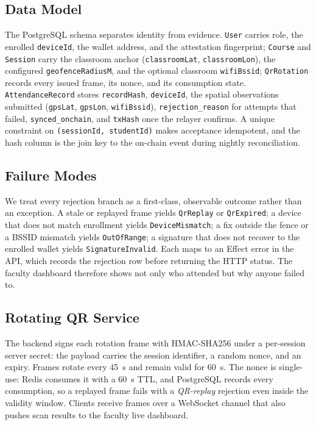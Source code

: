 \documentclass[conference]{IEEEtran}
\begin{document}
\subsection{Data Model}
The PostgreSQL schema separates identity from evidence. \texttt{User} carries
role, the enrolled \texttt{deviceId}, the wallet address, and the attestation
fingerprint; \texttt{Course} and \texttt{Session} carry the classroom anchor
(\texttt{classroomLat}, \texttt{classroomLon}), the configured
\texttt{geofenceRadiusM}, and the optional classroom
\texttt{wifiBssid}; \texttt{QrRotation} records every issued frame, its nonce,
and its consumption state. \texttt{AttendanceRecord} stores
\texttt{recordHash}, \texttt{deviceId}, the spatial observations submitted
(\texttt{gpsLat}, \texttt{gpsLon}, \texttt{wifiBssid}), \texttt{rejection\_reason}
for attempts that failed, \texttt{synced\_onchain}, and \texttt{txHash} once
the relayer confirms. A unique constraint on \texttt{(sessionId, studentId)}
makes acceptance idempotent, and the hash column is the join key to the
on-chain event during nightly reconciliation.

\subsection{Failure Modes}
We treat every rejection branch as a first-class, observable outcome rather
than an exception. A stale or replayed frame yields \texttt{QrReplay} or
\texttt{QrExpired}; a device that does not match enrollment yields
\texttt{DeviceMismatch}; a fix outside the fence or a BSSID mismatch yields
\texttt{OutOfRange}; a signature that does not recover to the enrolled wallet
yields \texttt{SignatureInvalid}. Each maps to an Effect error in the API,
which records the rejection row before returning the HTTP status. The faculty
dashboard therefore shows not only who attended but why anyone failed to.

\subsection{Rotating QR Service}
The backend signs each rotation frame with HMAC-SHA256 under a per-session
server secret: the payload carries the session identifier, a random nonce, and
an expiry. Frames rotate every 45~s and remain valid for 60~s. The nonce is
single-use: Redis consumes it with a 60~s TTL, and PostgreSQL records every
consumption, so a replayed frame fails with a \emph{QR-replay} rejection even
inside the validity window. Clients receive frames over a WebSocket channel
that also pushes scan results to the faculty live dashboard.
\end{document}
